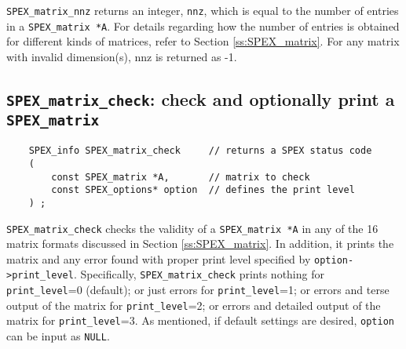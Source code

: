 \documentclass[12pt]{report}
\theoremstyle{definition}
\begin{document}
\verb|SPEX_matrix_nnz| returns an integer, \verb|nnz|, which is equal to the number of entries in a \verb|SPEX_matrix *A|.
For details regarding how the number of entries is obtained for different kinds
of matrices, refer to Section \ref{ss:SPEX_matrix}.
For any matrix with invalid dimension(s), nnz is returned as -1.

\subsection{\texttt{SPEX\_matrix\_check}: check and optionally print a \texttt{SPEX\_matrix}}
\label{s:user:matrix_check}

\begin{mdframed}[userdefinedwidth=6in]
{\footnotesize
\begin{verbatim}
    SPEX_info SPEX_matrix_check     // returns a SPEX status code
    (
        const SPEX_matrix *A,       // matrix to check
        const SPEX_options* option  // defines the print level
    ) ;
\end{verbatim}
} \end{mdframed}

\verb|SPEX_matrix_check| checks the validity of a \verb|SPEX_matrix *A| in any
of the 16 matrix formats discussed in Section \ref{ss:SPEX_matrix}.
In addition, it prints the matrix and any error found with proper print level specified by
\verb|option->print_level|. Specifically, \verb|SPEX_matrix_check| prints nothing for \verb|print_level|=0 (default); or just errors for \verb|print_level|=1; or errors and terse output of the matrix for \verb|print_level|=2; or errors and detailed output of the matrix for \verb|print_level|=3.
As mentioned, if default settings are desired, \verb|option| can be input as \verb|NULL|. 
\end{document}
